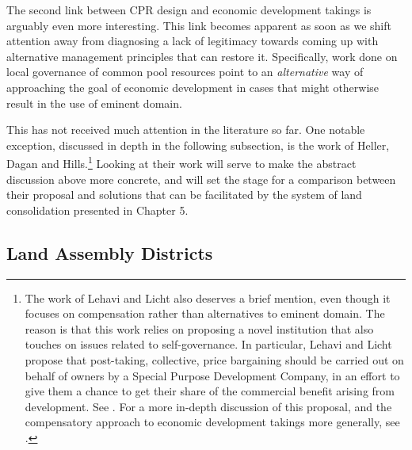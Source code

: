 
The second link between CPR design and economic development takings is arguably even more interesting. This link becomes apparent as soon as we shift attention away from diagnosing a lack of legitimacy towards coming up with alternative management principles that can restore it. Specifically, work done on local governance of common pool resources point to an {\it alternative} way of approaching the goal of economic development in cases that might otherwise result in the use of eminent domain. 

This has not received much attention in the literature so far. One notable exception, discussed in depth in the following subsection, is the work of Heller, Dagan and Hills.\footnote{The work of Lehavi and Licht also deserves a brief mention, even though it focuses on compensation rather than alternatives to eminent domain. The reason is that this work relies on proposing a novel institution that also touches on issues related to self-governance. In particular, Lehavi and Licht propose that post-taking, collective, price bargaining should be carried out on behalf of owners by a Special Purpose Development Company, in an effort to give them a chance to get their share of the commercial benefit arising from development. See \cite{lehavi07}. For a more in-depth discussion of this proposal, and the compensatory approach to economic development takings more generally, see \cite{dyrkolbotn15}.} Looking at their work will serve to make the abstract discussion above more concrete, and will set the stage for a comparison between their proposal and solutions that can be facilitated by the system of land consolidation presented in Chapter 5.

\subsection{Land Assembly Districts}\label{sec:lad}

